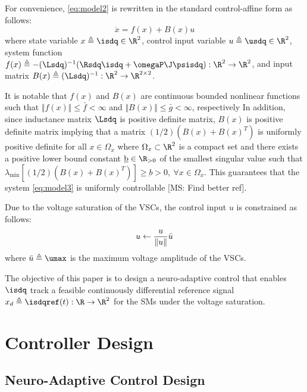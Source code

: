 \documentclass[conference]{IEEEtran}
\newcommand{\MSRY}[1]{{\color{red} [MS: #1]}} %
\begin{document}
For convenience, \eqref{eq:model2} is rewritten in the standard control-affine form as follows:
\begin{equation}
	\dot x = f(x) + B(x) u
	\label{eq:model3}
\end{equation}
where state variable $x \triangleq \isdq\in\R^2$, control input variable $u \triangleq \usdq\in\R^2$, system function $f(x) \triangleq -(\Lsdq)^{-1}(\Rsdq \isdq + \omegaP \J \psisdq):\R^2\to\R^2$, and input matrix $B(x) \triangleq (\Lsdq)^{-1}:\R^2\to\R^{2\times 2}$.

It is notable that $f(x)$ and $B(x)$ are continuous bounded nonlinear functions such that $\Vert f(x)\Vert \le \bar f<\infty$ and $\Vert B(x)\Vert \le \bar g<\infty$, respectively
In addition, since inductance matrix $\Lsdq$ is positive definite matrix, $B(x)$ is positive definite matrix implying that a matrix $(1/2)(B(x)+B(x)^T)$ is uniformly positive definite for all $x\in\Omega_x$ where $\Omega_x\subset\R^2$ is a compact set and there exists a positive lower bound constant $\underbar{b}\in\R_{>0}$ of the smallest singular value such that $\lambda_\text{min} [(1/2)(B(x)+B(x)^T)] \ge \underbar b >0,\ \forall x\in\Omega_x$.
This guarantees that the system \eqref{eq:model3} is uniformly controllable \cite{Xu:2003aa} \MSRY{Find better ref}.

Due to the voltage saturation of the VSCs, the control input $u$ is constrained as follows:
\begin{equation}
	u \leftarrow {u\over \Vert u\Vert} \bar u
\end{equation}
where $\bar u\triangleq \umax$ is the maximum voltage amplitude of the VSCs.

The objective of this paper is to design a neuro-adaptive control that enables $\isdq$ track a feasible continuously differential reference signal $x_d \triangleq \isdqref(t):\R\to\R^2$ for the SMs under the voltage saturation.

\section{Controller Design}

\subsection{Neuro-Adaptive Control Design}
\end{document}

